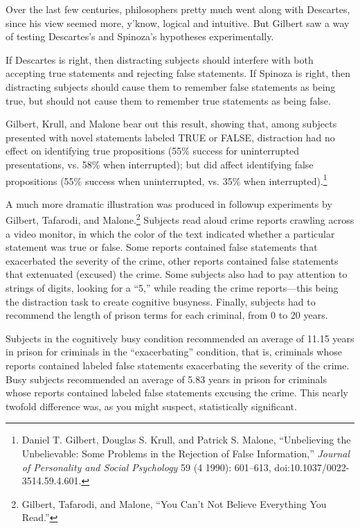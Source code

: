 {
 Over the last few centuries, philosophers pretty much went along
with Descartes, since his view seemed more, y'know,
logical and intuitive. But Gilbert saw a way of testing
Descartes's and Spinoza's hypotheses
experimentally.}

{
 If Descartes is right, then distracting subjects should interfere
with both accepting true statements and rejecting false statements. If
Spinoza is right, then distracting subjects should cause them to
remember false statements as being true, but should not cause them to
remember true statements as being false.}

{
 Gilbert, Krull, and Malone bear out this result, showing that,
among subjects presented with novel statements labeled TRUE or FALSE,
distraction had no effect on identifying true propositions (55\%
success for uninterrupted presentations, vs. 58\% when interrupted);
but did affect identifying false propositions (55\% success when
uninterrupted, vs. 35\% when interrupted).\footnote{Daniel T. Gilbert, Douglas S. Krull, and Patrick S. Malone,
``Unbelieving the Unbelievable: Some Problems in the
Rejection of False Information,'' \textit{Journal of
Personality and Social Psychology} 59 (4 1990): 601--613,
doi:10.1037/0022-3514.59.4.601.}}

{
 A much more dramatic illustration was produced in followup
experiments by Gilbert, Tafarodi, and Malone.\footnote{Gilbert, Tafarodi, and Malone, ``You
Can't Not Believe Everything You
Read.''}
Subjects read aloud crime reports crawling across a video monitor, in
which the color of the text indicated whether a particular statement
was true or false. Some reports contained false statements that
exacerbated the severity of the crime, other reports contained false
statements that extenuated (excused) the crime. Some subjects also had
to pay attention to strings of digits, looking for a
``5,'' while reading the crime
reports---this being the distraction task to create cognitive busyness.
Finally, subjects had to recommend the length of prison terms for each
criminal, from 0 to 20 years.}

{
 Subjects in the cognitively busy condition recommended an average
of 11.15 years in prison for criminals in the
``exacerbating'' condition, that is,
criminals whose reports contained labeled false statements exacerbating
the severity of the crime. Busy subjects recommended an average of 5.83
years in prison for criminals whose reports contained labeled false
statements excusing the crime. This nearly twofold difference was, as
you might suspect, statistically significant.}

